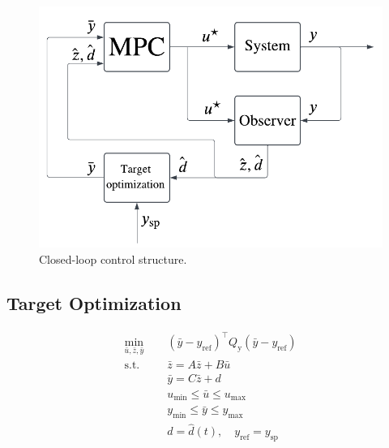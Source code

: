 \documentclass[preprint,12pt,authoryear]{elsarticle}
\begin{document}
\begin{figure}[H]
  \centering
  \includegraphics[width=0.95\linewidth]{figures/close_loop.pdf}
  \caption{Closed-loop control structure.}
  \label{fig:close_loop}
\end{figure}

\subsection{Target Optimization}

\begin{subequations}
  \label{eq:target:opt}
  \begin{align}
    \min_{\bar{u}, \bar{z}, \bar{y}} \quad & \; (\bar{y} - y_\text{ref})^\intercal Q_\text{y} (\bar{y} - y_\text{ref}) \label{eq:target:opt:obj} \\
    \text{s.t.} \quad & \; \bar{z} = A\bar{z} + B\bar{u} \label{eq:target:opt:z} \\
    & \; \bar{y} = C\bar{z} + d \label{eq:target:opt:y} \\
    & \; u_{\min} \leq \bar{u} \leq u_{\max} \label{eq:target:opt:u} \\
    & \; y_{\min} \leq \bar{y} \leq y_{\max} \label{eq:target:opt:ycon} \\
    & \; d = \hat{d}(t), \quad y_\text{ref} = y_\text{sp} \label{eq:target:opt:params}
  \end{align}
\end{subequations}
\end{document}
